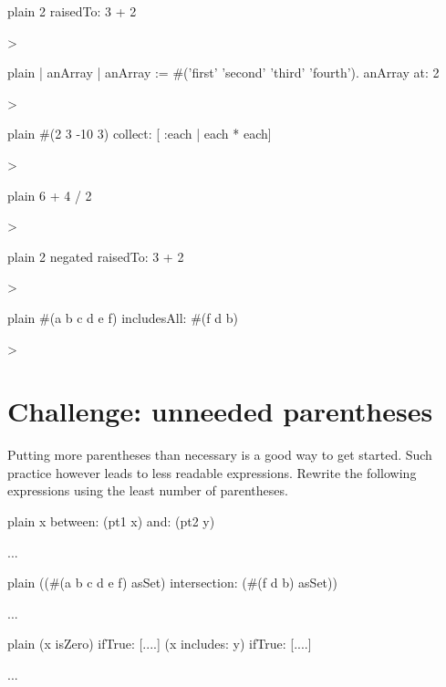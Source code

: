 \documentclass[10pt,twoside,english]{_support/latex/sbabook/sbabook}
\begin{document}
\begin{displaycode}{plain}
2 raisedTo: 3 + 2

>
\end{displaycode}

\begin{displaycode}{plain}
| anArray |
anArray := #('first' 'second' 'third' 'fourth').
anArray at: 2


> 
\end{displaycode}

\begin{displaycode}{plain}
#(2 3 -10 3) collect: [ :each | each * each]

>
\end{displaycode}

\begin{displaycode}{plain}
6 + 4 / 2

>
\end{displaycode}

\begin{displaycode}{plain}
2 negated raisedTo: 3 + 2

>
\end{displaycode}

\begin{displaycode}{plain}
#(a b c d e f) includesAll: #(f d b)

>
\end{displaycode}
\section{Challenge: unneeded parentheses }
Putting more  parentheses than necessary is  a good way  to get started. Such  practice however leads to  less readable expressions. Rewrite the following expressions using the least number of parentheses. 

\begin{displaycode}{plain}
x between: (pt1 x) and: (pt2 y)


 ...
\end{displaycode}

\begin{displaycode}{plain}
((#(a b c d e f) asSet) intersection: (#(f d b) asSet))


 ...
\end{displaycode}

\begin{displaycode}{plain}
(x isZero)
     ifTrue: [....]
(x includes: y)
     ifTrue: [....]
	 




 ...
\end{displaycode}
\end{document}
